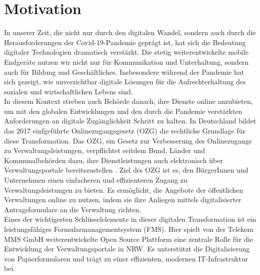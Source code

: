 \section{Motivation}


In unserer Zeit, die nicht nur durch den digitalen Wandel, sondern auch durch die Herausforderungen der Covid-19-Pandemie geprägt ist, hat sich die Bedeutung digitaler Technologien dramatisch verstärkt. Die stetig weiterentwickelte mobile Endgeräte nutzen wir nicht nur für Kommunikation und Unterhaltung, sondern auch für Bildung und Geschäftliches. Insbesondere während der Pandemie hat sich gezeigt, wie unverzichtbar digitale Lösungen für die Aufrechterhaltung des sozialen und wirtschaftlichen Lebens sind.\\

In diesem Kontext streben auch Behörde danach, ihre Dienste online anzubieten, um mit den globalen Entwicklungen und den durch die Pandemie verstärkten Anforderungen an digitale Zugänglichkeit Schritt zu halten. In Deutschland bildet das 2017 einfgeführte Onlinezugangsgesetz (OZG) die rechtliche Grundlage für diese Transformation. Das OZG, ein Gesetz zur Verbesserung des Onlinezugangs zu Verwaltungsleistungen, verpflichtet seitdem Bund, Länder und Kommunalbehörden dazu, ihre Dienstleistungen auch elektronisch über Verwaltungsportale bereitszustellen \citep{bundesministerium_des_innern_und_fur_heimat_onlinezugangsgesetz_2017}. Ziel des OZG ist es, den BürgerInnen und Unternehmen einen einfacheren und effizienteren Zugang zu Verwaltungsleistungen zu bieten. Es ermöglicht, die Angebote der öffentlichen Verwaltungen online zu nutzen, indem sie ihre Anliegen mittels digitalisierter Antragsformulare an die Verwaltung richten.\\

Eines der wichtigesten Schlüsselelemente in dieser digitalen Transformation ist ein leistungsfähiges Formularmanagementsystem (FMS). Hier spielt von der Telekom MMS GmbH weiterentwickelte Open Source Plattform \cite{formio} eine zentrale Rolle für die Entwicklung der Verwaltungsportale in NRW. Es unterstützt die Digitalisierung von Papierformularen und trägt zu einer effizienten, modernen IT-Infrastruktur bei.\\

